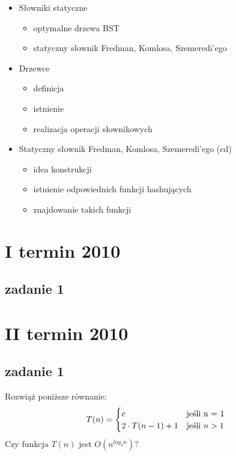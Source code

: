 \documentclass[svgnames]{report}
\begin{document}
\begin{itemize}
\item Słowniki statyczne
\begin{itemize}
	\item optymalne drzewa BST
	\item statyczny słownik Fredman, Komlosa, Szemeredi'ego
\end{itemize}

\item{Drzewce}
\begin{itemize}
	\item definicja
	\item istnienie
	\item realizacja operacji słownikowych
\end{itemize}


\item Statyczny słownik Fredman, Komlosa, Szemeredi'ego (cd)
\begin{itemize}
	\item idea konstrukcji
	\item istnienie odpowiednich funkcji hashujących
	\item znajdowanie takich funkcji
\end{itemize}


\end{itemize}
\chapter{I termin 2010}
\section{zadanie 1}


\chapter{II termin 2010}

\section{zadanie 1}
\begin{framed}
Rozwiąż poniższe równanie:
\begin{equation*}
T(n) = 
	\begin{cases}
		c 					&	\hbox{jeśli n = 1}		\\
		2 \cdot T(n-1) + 1 	&	\hbox{jeśli $n > 1$}	\\
	\end{cases}
\end{equation*}
Czy funkcja $T(n)$ jest $O(n^{log_2 n})$?

\end{framed}
\end{document}
